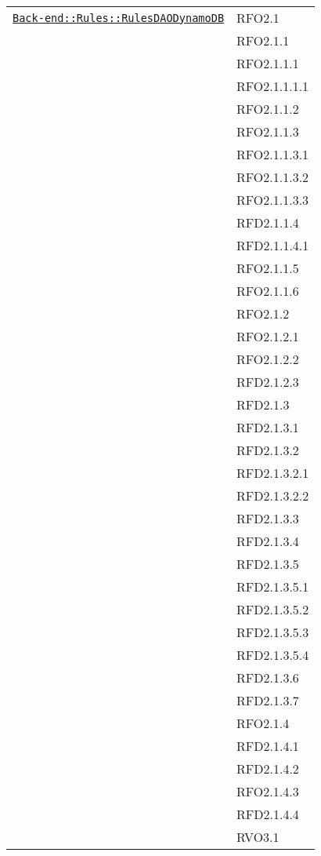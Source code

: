 \begin{longtable}{|>{\centering}m{10cm}|m{3cm}<{\centering}|}
\hyperref[Back-end::Rules::RulesDAODynamoDB]{\texttt{Back-end::Rules::RulesDAODynamoDB}} & RFO2.1\\
& RFO2.1.1\\
& RFO2.1.1.1\\
& RFO2.1.1.1.1\\
& RFO2.1.1.2\\
& RFO2.1.1.3\\
& RFO2.1.1.3.1\\
& RFO2.1.1.3.2\\
& RFO2.1.1.3.3\\
& RFD2.1.1.4\\
& RFD2.1.1.4.1\\
& RFO2.1.1.5\\
& RFO2.1.1.6\\
& RFO2.1.2\\
& RFO2.1.2.1\\
& RFO2.1.2.2\\
& RFD2.1.2.3\\
& RFD2.1.3\\
& RFD2.1.3.1\\
& RFD2.1.3.2\\
& RFD2.1.3.2.1\\
& RFD2.1.3.2.2\\
& RFD2.1.3.3\\
& RFD2.1.3.4\\
& RFD2.1.3.5\\
& RFD2.1.3.5.1\\
& RFD2.1.3.5.2\\
& RFD2.1.3.5.3\\
& RFD2.1.3.5.4\\
& RFD2.1.3.6\\
& RFD2.1.3.7\\
& RFO2.1.4\\
& RFD2.1.4.1\\
& RFD2.1.4.2\\
& RFO2.1.4.3\\
& RFD2.1.4.4\\
& RVO3.1\\ \hline


\end{longtable}
